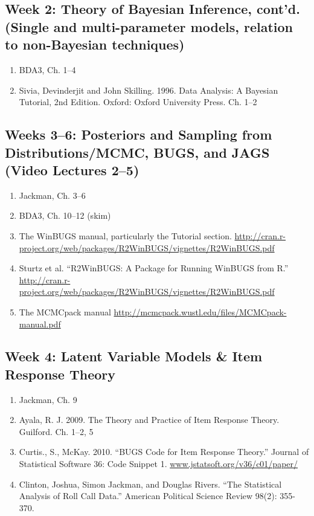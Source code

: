 \documentclass[11pt, leqno, fleqn]{article}
\begin{document}
\subsection*{Week 2: Theory of Bayesian Inference, cont'd. (Single and multi-parameter models, relation to non-Bayesian techniques)}
	\begin{enumerate}
	\item[] BDA3, Ch. 1--4
	\item[] Sivia, Devinderjit and John Skilling. 1996. Data Analysis: A Bayesian Tutorial, 2nd Edition. Oxford: Oxford University Press. Ch. 1--2
	\end{enumerate}
\subsection*{Weeks 3--6: Posteriors and Sampling from Distributions/MCMC, BUGS, and JAGS (Video Lectures 2--5)} 
	\begin{enumerate}
	\item[] Jackman, Ch. 3--6
	\item[] BDA3, Ch. 10--12 (skim)
	\item[] The WinBUGS manual, particularly the Tutorial section. \url{http://cran.r-
project.org/web/packages/R2WinBUGS/vignettes/R2WinBUGS.pdf}
	\item[] Sturtz et al. ``R2WinBUGS: A Package for Running WinBUGS from R.'' \url{http://cran.r-project.org/web/packages/R2WinBUGS/vignettes/R2WinBUGS.pdf}
	\item[] The MCMCpack manual \url{http://mcmcpack.wustl.edu/files/MCMCpack-manual.pdf}
	\end{enumerate}
\subsection*{Week 4: Latent Variable Models \& Item Response Theory}
	\begin{enumerate}
	\item[] Jackman, Ch. 9
	\item[] Ayala, R. J. 2009. The Theory and Practice of Item Response Theory. Guilford. Ch. 1--2, 5
	\item[] Curtis., S., McKay. 2010. ``BUGS Code for Item Response Theory.'' Journal of
Statistical Software 36: Code Snippet 1. \url{
www.jstatsoft.org/v36/c01/paper/}
	\item[] Clinton, Joshua, Simon Jackman, and Douglas Rivers. ``The Statistical Analysis
of Roll Call Data.'' American Political Science Review 98(2): 355-370.
	\end{enumerate}
\end{document}
